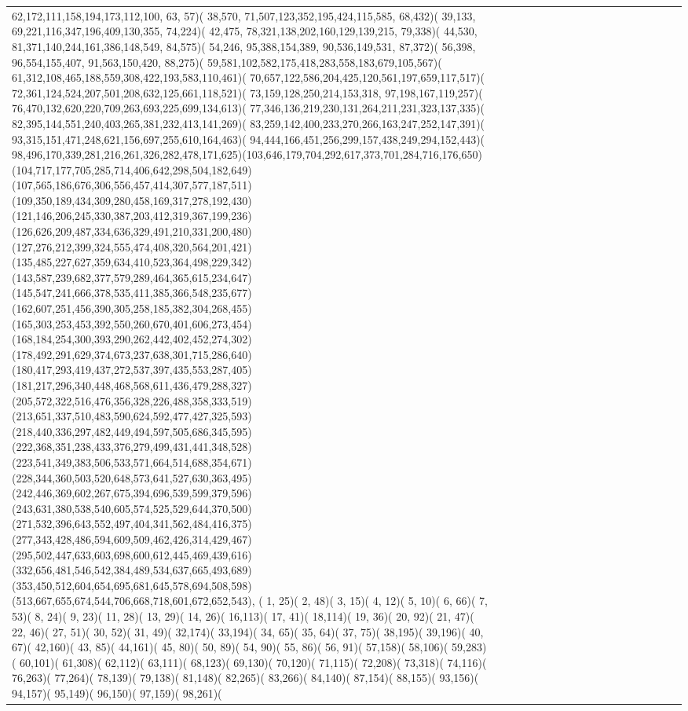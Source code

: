 \documentclass[varwidth=\maxdimen,border=10]{standalone}
\begin{document}
\begin{tabular}{@{}l@{}l@{}l@{}l@{}l@{}l@{}l@{}l@{}l@{}l@{}l@{}l@{}l@{}l@{}l@{}l@{}l@{}l@{}}
62,172,111,158,194,173,112,100, 63, 57)( 38,570, 71,507,123,352,195,424,115,585, 68,432)( 39,133, 69,221,116,347,196,409,130,355, 74,224)( 42,475, 78,321,138,202,160,129,139,215, 79,338)( 44,530, 81,371,140,244,161,386,148,549, 84,575)( 54,246, 95,388,154,389, 90,536,149,531, 87,372)( 56,398, 96,554,155,407, 91,563,150,420, 88,275)( 59,581,102,582,175,418,283,558,183,679,105,567)( 61,312,108,465,188,559,308,422,193,583,110,461)( 70,657,122,586,204,425,120,561,197,659,117,517)( 72,361,124,524,207,501,208,632,125,661,118,521)( 73,159,128,250,214,153,318, 97,198,167,119,257)( 76,470,132,620,220,709,263,693,225,699,134,613)( 77,346,136,219,230,131,264,211,231,323,137,335)( 82,395,144,551,240,403,265,381,232,413,141,269)( 83,259,142,400,233,270,266,163,247,252,147,391)( 93,315,151,471,248,621,156,697,255,610,164,463)( 94,444,166,451,256,299,157,438,249,294,152,443)( 98,496,170,339,281,216,261,326,282,478,171,625)(103,646,179,704,292,617,373,701,284,716,176,650)(104,717,177,705,285,714,406,642,298,504,182,649)(107,565,186,676,306,556,457,414,307,577,187,511)(109,350,189,434,309,280,458,169,317,278,192,430)(121,146,206,245,330,387,203,412,319,367,199,236)(126,626,209,487,334,636,329,491,210,331,200,480)(127,276,212,399,324,555,474,408,320,564,201,421)(135,485,227,627,359,634,410,523,364,498,229,342)(143,587,239,682,377,579,289,464,365,615,234,647)(145,547,241,666,378,535,411,385,366,548,235,677)(162,607,251,456,390,305,258,185,382,304,268,455)(165,303,253,453,392,550,260,670,401,606,273,454)(168,184,254,300,393,290,262,442,402,452,274,302)(178,492,291,629,374,673,237,638,301,715,286,640)(180,417,293,419,437,272,537,397,435,553,287,405)(181,217,296,340,448,468,568,611,436,479,288,327)(205,572,322,516,476,356,328,226,488,358,333,519)(213,651,337,510,483,590,624,592,477,427,325,593)(218,440,336,297,482,449,494,597,505,686,345,595)(222,368,351,238,433,376,279,499,431,441,348,528)(223,541,349,383,506,533,571,664,514,688,354,671)(228,344,360,503,520,648,573,641,527,630,363,495)(242,446,369,602,267,675,394,696,539,599,379,596)(243,631,380,538,540,605,574,525,529,644,370,500)(271,532,396,643,552,497,404,341,562,484,416,375)(277,343,428,486,594,609,509,462,426,314,429,467)(295,502,447,633,603,698,600,612,445,469,439,616)(332,656,481,546,542,384,489,534,637,665,493,689)(353,450,512,604,654,695,681,645,578,694,508,598)(513,667,655,674,544,706,668,718,601,672,652,543), (  1, 25)(  2, 48)(  3, 15)(  4, 12)(  5, 10)(  6, 66)(  7, 53)(  8, 24)(  9, 23)( 11, 28)( 13, 29)( 14, 26)( 16,113)( 17, 41)( 18,114)( 19, 36)( 20, 92)( 21, 47)( 22, 46)( 27, 51)( 30, 52)( 31, 49)( 32,174)( 33,194)( 34, 65)( 35, 64)( 37, 75)( 38,195)( 39,196)( 40, 67)( 42,160)( 43, 85)( 44,161)( 45, 80)( 50, 89)( 54, 90)( 55, 86)( 56, 91)( 57,158)( 58,106)( 59,283)( 60,101)( 61,308)( 62,112)( 63,111)( 68,123)( 69,130)( 70,120)( 71,115)( 72,208)( 73,318)( 74,116)( 76,263)( 77,264)( 78,139)( 79,138)( 81,148)( 82,265)( 83,266)( 84,140)( 87,154)( 88,155)( 93,156)( 94,157)( 95,149)( 96,150)( 97,159)( 98,261)( 
\end{tabular}
\end{document}
